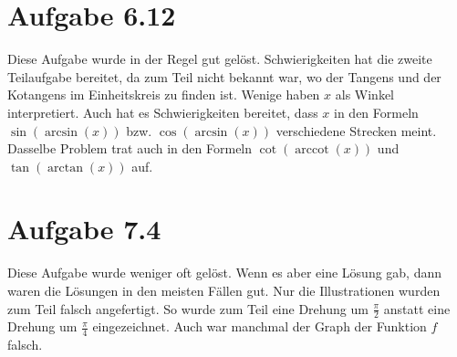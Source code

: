 \documentclass[a4paper]{article}
\begin{document}
\section{Aufgabe 6.12}

Diese Aufgabe wurde in der Regel gut gelöst. Schwierigkeiten hat die zweite Teilaufgabe bereitet, da zum Teil nicht bekannt war, wo der Tangens und der Kotangens im Einheitskreis zu finden ist. Wenige haben $x$ als Winkel interpretiert. Auch hat es Schwierigkeiten bereitet, dass $x$ in den Formeln $\sin(\operatorname{arcsin}(x))$ bzw. $\cos(\operatorname{arcsin}(x))$ verschiedene Strecken meint. Dasselbe Problem trat auch in den Formeln $\cot(\operatorname{arccot}(x))$ und $\tan(\operatorname{arctan}(x))$ auf.

\section{Aufgabe 7.4}

Diese Aufgabe wurde weniger oft gelöst. Wenn es aber eine Lösung gab, dann waren die Lösungen in den meisten Fällen gut. Nur die Illustrationen wurden zum Teil falsch angefertigt. So wurde zum Teil eine Drehung um $\tfrac \pi2$ anstatt eine Drehung um $\tfrac \pi4$ eingezeichnet. Auch war manchmal der Graph der Funktion $f$ falsch.
\end{document}
